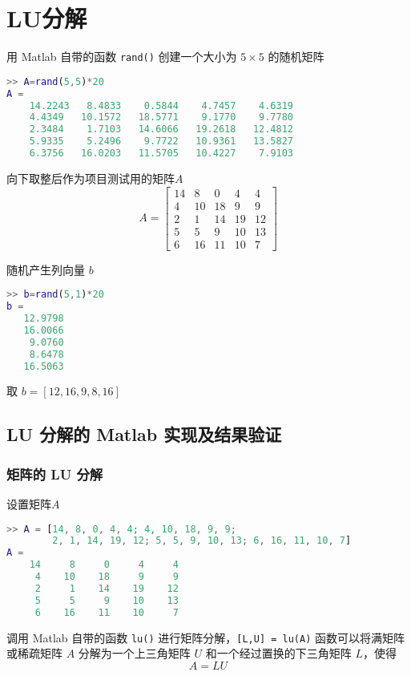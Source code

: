 \chapter{LU分解}
用 Matlab 自带的函数 \lstinline|rand()| 创建一个大小为 $5\times 5$ 的随机矩阵


\begin{lstlisting}[language=Matlab]  
>> A=rand(5,5)*20
A =
    14.2243   8.4833    0.5844    4.7457    4.6319
    4.4349   10.1572   18.5771    9.1770    9.7780
    2.3484    1.7103   14.6066   19.2618   12.4812
    5.9335    5.2496    9.7722   10.9361   13.5827
    6.3756   16.0203   11.5705   10.4227    7.9103
\end{lstlisting}


向下取整后作为项目测试用的矩阵$A$
\begin{equation}
    A=\begin{bmatrix}
        14 & 8  & 0  & 4  & 4  \\
        4  & 10 & 18 & 9  & 9  \\
        2  & 1  & 14 & 19 & 12 \\
        5  & 5  & 9  & 10 & 13 \\
        6  & 16 & 11 & 10 & 7
    \end{bmatrix}
\end{equation}

随机产生列向量 $b$
\begin{lstlisting}[language=Matlab]  
>> b=rand(5,1)*20
b =
   12.9798
   16.0066
    9.0760
    8.6478
   16.5063
\end{lstlisting}

取 $b=[12,16,9,8,16]$

\section{LU 分解的 Matlab 实现及结果验证}
\subsection{矩阵的 LU 分解}
设置矩阵$A$
\begin{lstlisting}[language=Matlab]  
>> A = [14, 8, 0, 4, 4; 4, 10, 18, 9, 9;
        2, 1, 14, 19, 12; 5, 5, 9, 10, 13; 6, 16, 11, 10, 7]
A =
    14     8     0     4     4
     4    10    18     9     9
     2     1    14    19    12
     5     5     9    10    13
     6    16    11    10     7
\end{lstlisting}

调用 Matlab 自带的函数 \lstinline|lu()| 进行矩阵分解，\lstinline|[L,U] = lu(A)| 函数可以将满矩阵或稀疏矩阵 $A$ 分解为一个上三角矩阵 $U$ 和一个经过置换的下三角矩阵 $L$，使得
\begin{equation}
    A = LU
\end{equation}

